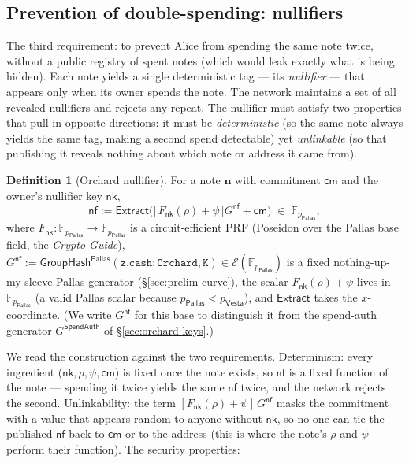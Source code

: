 \documentclass[11pt,a4paper]{article}
\theoremstyle{definition}
\newtheorem{definition}[theorem]{Definition}
\newcommand{\F}{\mathbb{F}}
\newcommand{\nfsym}{\mathsf{nf}}
\newcommand{\cmsym}{\mathsf{cm}}
\newcommand{\Pallas}{\ensuremath{\mathsf{Pallas}}}
\newcommand{\Vesta}{\ensuremath{\mathsf{Vesta}}}
\newcommand{\Ep}{\ensuremath{\mathcal{E}}}
\newcommand{\Extract}{\ensuremath{\mathsf{Extract}}}
\newcommand{\GroupHash}{\ensuremath{\mathsf{GroupHash}}}
\newcommand{\nksym}{\ensuremath{\mathsf{nk}}}
\begin{document}
\subsection{Prevention of double-spending: nullifiers}\label{sec:nullifier}

The third requirement: to prevent Alice from spending the same note twice, without a
public registry of spent notes (which would leak exactly what is being
hidden). Each note yields a single deterministic
tag --- its \emph{nullifier} --- that appears only when its owner spends the note.
The network maintains a set of all revealed nullifiers and rejects any
repeat. The nullifier must satisfy two properties that pull in opposite directions:
it must be \emph{deterministic} (so the same note always
yields the same tag, making a second spend detectable) yet
\emph{unlinkable} (so that publishing it reveals nothing about which note
or address it came from).

\begin{definition}[Orchard nullifier]\label{def:nullifier}
For a note $\mathbf{n}$ with commitment $\cmsym$ and the owner's nullifier
key $\nksym$,
\[
\nfsym := \Extract\bigl(\bigl[\, F_{\nksym}(\rho) + \psi \,\bigr] G^{\mathsf{nf}} + \cmsym\bigr) \;\in\; \F_{p_{\Pallas}},
\]
where $F_{\nksym} : \F_{p_{\Pallas}} \to \F_{p_{\Pallas}}$ is a
circuit-efficient PRF (Poseidon over the Pallas base
field, the \emph{Crypto Guide}), $G^{\mathsf{nf}} := \GroupHash^{\Pallas}
(\mathtt{z.cash:Orchard}, \mathtt{K}) \in \Ep(\F_{p_{\Pallas}})$ is a fixed
nothing-up-my-sleeve Pallas generator (\S\ref{sec:prelim-curve}), the scalar $F_{\nksym}(\rho) +
\psi$ lives in $\F_{p_{\Pallas}}$ (a valid Pallas scalar because
$p_{\Pallas} < p_{\Vesta}$), and $\Extract$ takes the $x$-coordinate. (We
write $G^{\mathsf{nf}}$ for this base to distinguish it from the spend-auth
generator $G^{\mathsf{SpendAuth}}$ of \S\ref{sec:orchard-keys}.)
\end{definition}

We read the construction against the two requirements. Determinism: every
ingredient ($\nksym, \rho, \psi, \cmsym$) is fixed once the note exists, so
$\nfsym$ is a fixed function of the note --- spending it twice yields the same
$\nfsym$ twice, and the network rejects the second. Unlinkability: the term
$[F_{\nksym}(\rho) + \psi]\,G^{\mathsf{nf}}$ masks the commitment with a value that appears random
to anyone without $\nksym$, so no one can tie the published $\nfsym$ back
to $\cmsym$ or to the address (this is where the note's $\rho$ and $\psi$ perform their function). The security properties:
\end{document}
